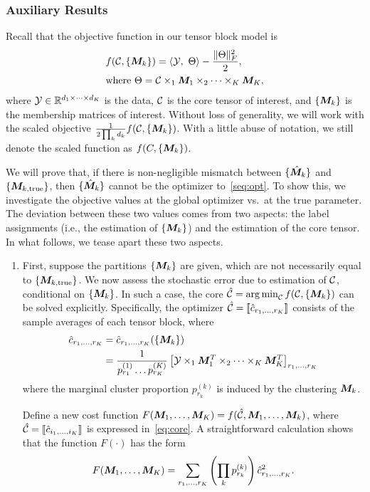 \documentclass{article}
\begin{document}
\begin{appendices}
\subsubsection{Auxiliary Results}

Recall that the objective function in our tensor block model is 
\begin{align}\label{seq:opt}
&f(\mathcal{C}, \{ \bm M_k\})=\langle \mathcal{Y},\ \Theta\rangle -\frac{\lVert\Theta\rVert_F^2}{2},\\
&\text{where } \Theta=\mathcal{C}\times_1\bm M_1\times_2\cdots\times_K \bm M_K,
\end{align}
where $\mathcal{Y}\in\mathbb{R}^{d_1\times \cdots \times d_K}$ is the data, $\mathcal{C}$ is the core tensor of interest, and $\{\bm M_k\}$ is the membership matrices of interest. Without loss of generality, we will work with the scaled objective ${1\over 2\prod_k d_k}f(\mathcal{C}, \{\bm M_k\})$. With a little abuse of notation, we still denote the scaled function as $f(C,\{\bm M_k\})$.

We will prove that, if there is non-negligible mismatch between $\{\hat{ \bm M}_k\}$ and $\{\bm M_{k,\text{true}}\}$, then $\{\hat{ \bm M}_k\}$ cannot be the optimizer to~\eqref{seq:opt}. To show this, we investigate the objective values at the global optimizer vs.\ at the true parameter. The deviation between these two values comes from two aspects: the label assignments (i.e., the estimation of $\{\bm M_k\}$) and the estimation of the core tensor. In what follows, we tease apart these two aspects.
 
 \begin{enumerate}
\item First, suppose the partitions $\{\bm M_k\}$ are given, which are not necessarily equal to $\{\bm M_{k,\text{true}}\}$. We now assess the stochastic error due to estimation of $\mathcal{C}$, conditional on $\{\bm M_k\}$. In such a case, the core $\hat {\mathcal{C}} = \operatorname*{arg\,min}_{\mathcal{C}} f(\mathcal{C},\{\bm M_k\})$ can be solved explicitly. Specifically, the optimizer $\hat {\mathcal{C}}=\llbracket \hat c_{r_1,\ldots,r_K} \rrbracket$ consists of the sample averages of each tensor block, where
\begin{align}\label{eq:core}
\displaystyle \hat c_{r_1,\ldots,r_K}&=\hat c_{r_1,\ldots,r_K}(\{\bm M_k\})\\
&= \frac{1}{p_{r_1}^{(1)}\ldots p_{r_K}^{(K)}}\left[\mathcal{Y}\times_1\bm M^T_1\times_2\cdots\times_K \bm M^T_K\right]_{r_1,\ldots,r_K}
\end{align}
where the marginal cluster proportion $p^{(k)}_{r_k}$ is induced by the clustering $\bm M_k$. 

Define a new cost function $F(\bm M_1,\ldots,\bm M_K)= f(\hat {\mathcal{C}}, \bm M_1,\ldots,\bm M_k)$, where $\hat {\mathcal{C}}=\llbracket \hat c_{i_1,\ldots,i_K} \rrbracket$ is expressed in~\eqref{eq:core}. A straightforward calculation shows that the function $F(\cdot)$ has the form
\begin{equation}\label{eq:F}
F(\bm M_1,\ldots,\bm M_K) = \sum_{r_1,\ldots,r_K}\left(\prod_k p^{(k)}_{r_k}\right) \hat c_{r_1,\ldots,r_K}^2.
\end{equation}



\end{enumerate}
\end{appendices}
\end{document}
